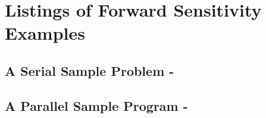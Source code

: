 \section{Listings of {\cvodes} Forward Sensitivity Examples}\label{s:fwd_codes}

\subsection{A Serial Sample Problem - }\label{ss:cvfdx}

\newpage
\subsection{A Parallel Sample Program - }\label{ss:pvfkx}
